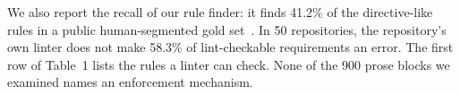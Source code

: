 \documentclass{article}
\begin{document}
We also report the recall of our rule finder: it finds 41.2\% of the directive-like rules in a public
human-segmented gold set~\cite{gold}.
In 50 repositories, the repository's own linter does not make 58.3\% of lint-checkable requirements an error.
The first row of Table~1 lists the rules a linter can check.
None of the 900 prose blocks we examined names an enforcement mechanism.
\end{document}
